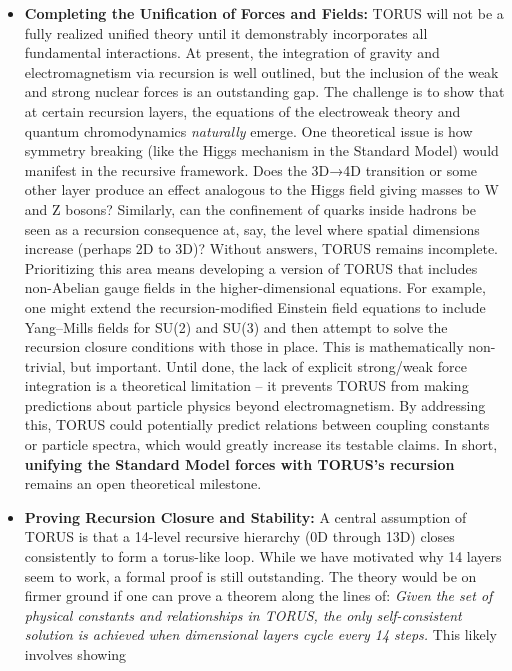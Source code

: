 \documentclass[
]{article}
\begin{document}
\begin{itemize}
\item
  \textbf{Completing the Unification of Forces and Fields:} TORUS will
  not be a fully realized unified theory until it demonstrably
  incorporates all fundamental interactions. At present, the integration
  of gravity and electromagnetism via recursion is well outlined, but
  the inclusion of the weak and strong nuclear forces is an outstanding
  gap\hspace{0pt}. The challenge is to show that at certain recursion
  layers, the equations of the electroweak theory and quantum
  chromodynamics \emph{naturally} emerge. One theoretical issue is how
  symmetry breaking (like the Higgs mechanism in the Standard Model)
  would manifest in the recursive framework. Does the 3D→4D transition
  or some other layer produce an effect analogous to the Higgs field
  giving masses to W and Z bosons? Similarly, can the confinement of
  quarks inside hadrons be seen as a recursion consequence at, say, the
  level where spatial dimensions increase (perhaps 2D to 3D)? Without
  answers, TORUS remains incomplete. Prioritizing this area means
  developing a version of TORUS that includes non-Abelian gauge fields
  in the higher-dimensional equations. For example, one might extend the
  recursion-modified Einstein field equations to include Yang--Mills
  fields for SU(2) and SU(3) and then attempt to solve the recursion
  closure conditions with those in place. This is mathematically
  non-trivial, but important. Until done, the lack of explicit
  strong/weak force integration is a theoretical limitation -- it
  prevents TORUS from making predictions about particle physics beyond
  electromagnetism. By addressing this, TORUS could potentially predict
  relations between coupling constants or particle spectra, which would
  greatly increase its testable claims. In short, \textbf{unifying the
  Standard Model forces with TORUS's recursion} remains an open
  theoretical milestone.
\item
  \textbf{Proving Recursion Closure and Stability:} A central assumption
  of TORUS is that a 14-level recursive hierarchy (0D through 13D)
  closes consistently to form a torus-like loop. While we have motivated
  why 14 layers seem to work, a formal proof is still outstanding. The
  theory would be on firmer ground if one can prove a theorem along the
  lines of: \emph{Given the set of physical constants and relationships
  in TORUS, the only self-consistent solution is achieved when
  dimensional layers cycle every 14 steps.} This likely involves showing

\end{itemize}
\end{document}
